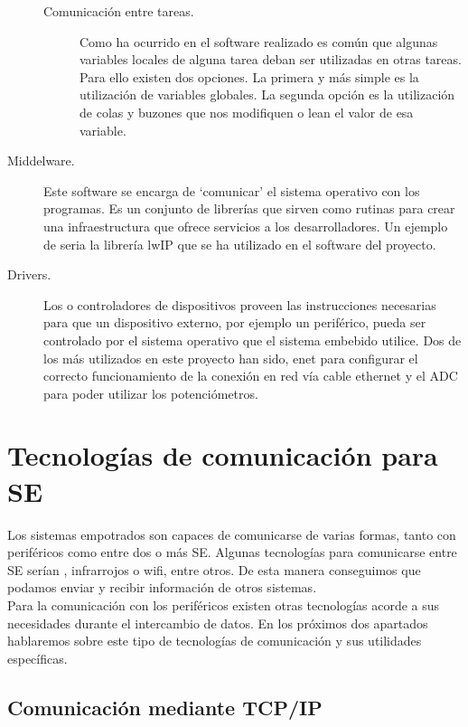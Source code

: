 \begin{description}
\begin{description}
\begin{description}
	\end{description}
\item[Comunicación entre tareas.] Como ha ocurrido en el software realizado es común que algunas variables locales de alguna tarea deban ser utilizadas en otras tareas. Para ello existen dos opciones. La primera y más simple es la utilización de variables globales. La segunda opción es la utilización de colas y buzones que nos modifiquen o lean el valor de esa variable.
\end{description}
\item[Middelware.] Este software se encarga de `comunicar' el sistema operativo con los programas. Es un conjunto de librerías que sirven como rutinas para crear una infraestructura que ofrece servicios a los desarrolladores. Un ejemplo de  seria la librería lwIP que se ha utilizado en el software del proyecto.
\item[Drivers.] Los  \cite{drivers} o controladores de dispositivos proveen las instrucciones necesarias para que un dispositivo externo, por ejemplo un periférico, pueda ser controlado por el sistema operativo que el sistema embebido utilice. Dos de los  más utilizados en este proyecto han sido, enet para configurar el correcto funcionamiento de la conexión en red vía cable ethernet y el  ADC para poder utilizar los potenciómetros.
\end{description}


\section{Tecnologías de comunicación para SE}\label{sec:Comunicaciones}

Los sistemas empotrados son capaces de comunicarse de varias formas, tanto con periféricos como entre dos o más SE. Algunas tecnologías para comunicarse entre SE serían , infrarrojos o wifi, entre otros. De esta manera conseguimos que podamos enviar y recibir información de otros sistemas. \\
Para la comunicación con los periféricos existen otras tecnologías acorde a sus necesidades durante el intercambio de datos. 
En los próximos dos apartados hablaremos sobre este tipo de tecnologías de comunicación y sus utilidades específicas. 

\subsection{Comunicación mediante TCP/IP}

